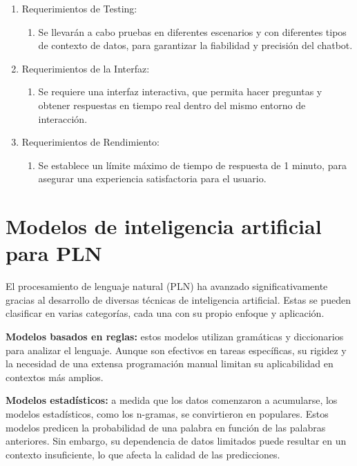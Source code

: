 \begin{enumerate}
	\newpage %
    \item Requerimientos de Testing:
        \begin{enumerate}
            \item Se llevarán a cabo pruebas en diferentes escenarios y con diferentes tipos de contexto de datos, para garantizar la fiabilidad y precisión del chatbot.
         \end{enumerate}
    \item Requerimientos de la Interfaz:
        \begin{enumerate}
            \item Se requiere una interfaz interactiva, que permita hacer preguntas y obtener respuestas en tiempo real dentro del mismo entorno de interacción.
        \end{enumerate}
    \item Requerimientos de Rendimiento:
        \begin{enumerate} 
            \item Se establece un límite máximo de tiempo de respuesta de 1 minuto, para asegurar una experiencia satisfactoria para el usuario.
        \end{enumerate}
  \end{enumerate}


  \section{Modelos de inteligencia artificial para PLN}
  El procesamiento de lenguaje natural (PLN) ha avanzado significativamente gracias al desarrollo de diversas técnicas de inteligencia artificial. Estas se pueden clasificar en varias categorías, cada una con su propio enfoque y aplicación.
     
  \textbf{Modelos basados en reglas:} estos modelos utilizan gramáticas y diccionarios para analizar el lenguaje. Aunque son efectivos en tareas específicas, su rigidez y la necesidad de una extensa programación manual limitan su aplicabilidad en contextos más amplios.
  
  \textbf{Modelos estadísticos:} a medida que los datos comenzaron a acumularse, los modelos estadísticos, como los n-gramas, se convirtieron en populares. Estos modelos predicen la probabilidad de una palabra en función de las palabras anteriores. Sin embargo, su dependencia de datos limitados puede resultar en un contexto insuficiente, lo que afecta la calidad de las predicciones.
  
